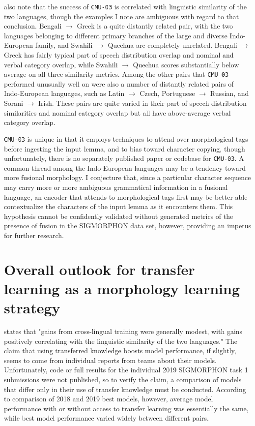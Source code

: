 \cite{McCarthy2019} also note that the success of \texttt{CMU-03} is correlated with linguistic similarity of the two languages, though the examples I note are ambiguous with regard to that conclusion. Bengali $\rightarrow$ Greek is a quite distantly related pair, with the two languages belonging to different primary branches of the large and diverse Indo-European family, and Swahili $\rightarrow$ Quechua are completely unrelated. Bengali $\rightarrow$ Greek has fairly typical part of speech distribution overlap and nominal and verbal category overlap, while Swahili $\rightarrow$ Quechua scores substantially below average on all three similarity metrics. Among the other pairs that \texttt{CMU-03} performed unusually well on were also a number of distantly related pairs of Indo-European languages, such as Latin $\rightarrow$ Czech, Portuguese $\rightarrow$ Russian, and Sorani $\rightarrow$ Irish. These pairs are quite varied in their part of speech distribution similarities and nominal category overlap but all have above-average verbal category overlap.

\texttt{CMU-03} is unique in that it employs techniques to attend over morphological tags before ingesting the input lemma, and to bias toward character copying, though unfortunately, there is no separately published paper or codebase for \texttt{CMU-03}. A common thread among the Indo-European languages may be a tendency toward more fusional morphology. I conjecture that, since a particular character sequence may carry more or more ambiguous grammatical information in a fusional language, an encoder that attends to morphological tags first may be better able contextualize the characters of the input lemma as it encounters them. This hypothesis cannot be confidently validated without generated metrics of the presence of fusion in the SIGMORPHON data set, however, providing an impetus for further research.

\section{Overall outlook for transfer learning as a morphology learning strategy}

\cite{McCarthy2019} states that "gains from cross-lingual training were generally modest, with gains positively correlating with the linguistic similarity of the two languages." The claim that using transferred knowledge boosts model performance, if slightly, seems to come from individual reports from teams about their models. Unfortunately, code or full results for the individual 2019 SIGMORPHON task 1 submissions were not published, so to verify the claim, a comparison of models that differ only in their use of transfer knowledge must be conducted. According to comparison of 2018 and 2019 best models, however, average model performance with or without access to transfer learning was essentially the same, while best model performance varied widely between different pairs.

